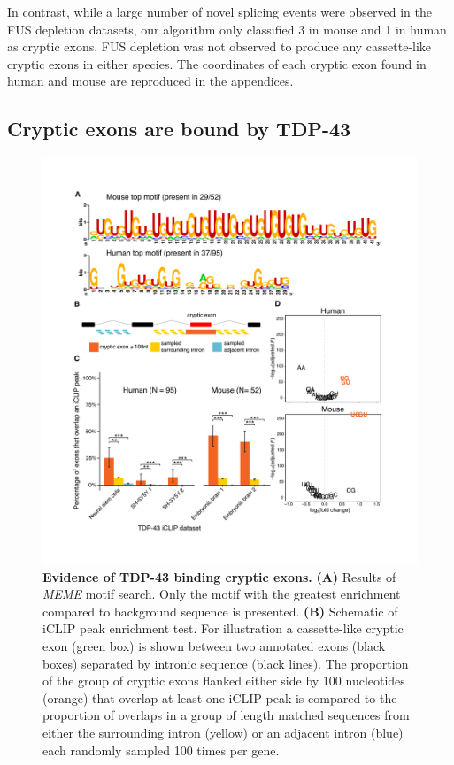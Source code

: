 In contrast, while a large number of novel splicing events were observed in the FUS depletion datasets, our algorithm only classified 3 in mouse and 1 in human as cryptic exons. FUS depletion was not observed to produce any cassette-like cryptic exons in either species. The coordinates of each cryptic exon found in human and mouse are reproduced in the appendices.

\subsection{Cryptic exons are bound by TDP-43}

\begin{figure}[h!]
	\centering
	\includegraphics[width=\textwidth]{Figures/03_cryptic_exons/Figure_2_motif_iCLIP.png} 
	\caption[Evidence of TDP-43 binding cryptic exons]{
		\textbf{Evidence of TDP-43 binding cryptic exons.}
	\textbf{(A)} Results of \emph{MEME} motif search. Only the motif with the greatest enrichment compared to background sequence is presented. 
	\textbf{(B)} Schematic of iCLIP peak enrichment test. For illustration a cassette-like cryptic exon (green box) is shown between two annotated exons (black boxes) separated by intronic sequence (black lines). The proportion of the group of cryptic exons flanked either side by 100 nucleotides (orange) that overlap at least one iCLIP peak is compared to the proportion of overlaps in a group of length matched sequences from either the surrounding intron (yellow) or an adjacent intron (blue) each randomly sampled 100 times per gene. 
}
\end{figure}
